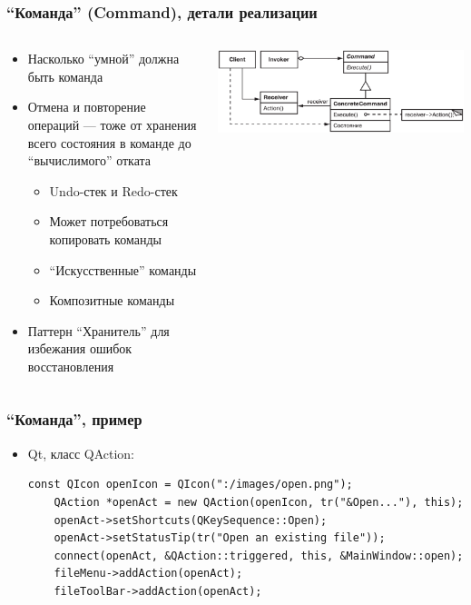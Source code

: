 \documentclass[xetex,mathserif,serif]{beamer}
\begin{document}
	\begin{frame}
		\frametitle{``Команда'' (Command), детали реализации}
		\begin{columns}
			\begin{column}{0.5\textwidth}
				\begin{itemize}
					\item Насколько ``умной'' должна быть команда
					\item Отмена и повторение операций --- тоже от хранения всего состояния в команде до ``вычислимого'' отката
					\begin{itemize}
						\item Undo-стек и Redo-стек
						\item Может потребоваться копировать команды
						\item ``Искусственные'' команды
						\item Композитные команды
					\end{itemize}
					\item Паттерн ``Хранитель'' для избежания ошибок восстановления
				\end{itemize}
			\end{column}
			\begin{column}{0.5\textwidth}
				\begin{center}
					\includegraphics[width=\textwidth]{command.png}
				\end{center}
			\end{column}
		\end{columns}
	\end{frame}

	\begin{frame}[fragile]
		\frametitle{``Команда'', пример}
		\begin{itemize}
			\item Qt, класс QAction:
			\begin{verbatim}
const QIcon openIcon = QIcon(":/images/open.png");
    QAction *openAct = new QAction(openIcon, tr("&Open..."), this);
    openAct->setShortcuts(QKeySequence::Open);
    openAct->setStatusTip(tr("Open an existing file"));
    connect(openAct, &QAction::triggered, this, &MainWindow::open);
    fileMenu->addAction(openAct);
    fileToolBar->addAction(openAct);
			\end{verbatim}
		\end{itemize}
\end{frame}
\end{document}
